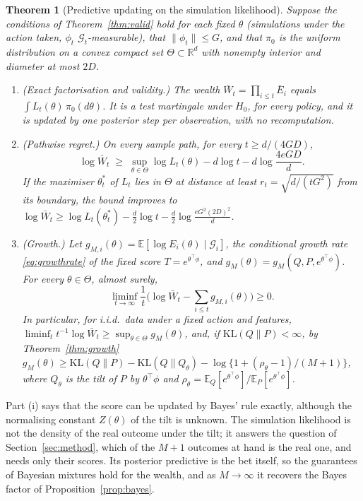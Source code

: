 \documentclass[12pt]{article}
\newcommand{\E}{\mathbb{E}}
\newcommand{\KL}{\mathrm{KL}}
\newcommand{\G}{\mathcal{G}}
\newtheorem{theorem}{Theorem}
\theoremstyle{remark}
\begin{document}
\begin{theorem}[Predictive updating on the simulation likelihood]\label{thm:simlik}
Suppose the conditions of Theorem~\ref{thm:valid} hold for each fixed $\theta$
(simulations under the action taken, $\phi_t$ $\G_t$-measurable), that
$\|\phi_t\| \le G$, and that $\pi_0$ is the uniform distribution on a convex
compact set $\Theta \subset \mathbb{R}^d$ with nonempty interior and diameter
at most $2D$.
\begin{enumerate}
  \item[(i)] (Exact factorisation and validity.) The wealth
        $\bar W_t = \prod_{i \le t} \bar E_i$ equals
        $\int L_t(\theta)\,\pi_0(d\theta)$. It is a test martingale under
        $H_0$, for every policy, and it is updated by one posterior step per
        observation, with no recomputation.
  \item[(ii)] (Pathwise regret.) On every sample path, for every
        $t \ge d/(4GD)$,
        \[
        \log \bar W_t \;\ge\; \sup_{\theta \in \Theta} \log L_t(\theta)
        - d \log t - d \log\frac{4eGD}{d}.
        \]
        If the maximiser $\theta^*_t$ of $L_t$ lies in $\Theta$ at distance at
        least $r_t = \sqrt{d/(tG^2)}$ from its boundary, the bound improves to
        $\log \bar W_t \ge \log L_t(\theta_t^*) - \frac d2 \log t
        - \frac d2 \log\frac{e G^2 (2D)^2}{d}$.
  \item[(iii)] (Growth.) Let $g_{M,i}(\theta) = \E[\log E_i(\theta) \mid \G_i]$,
        the conditional growth rate \eqref{eq:growthrate} of the fixed score
        $T = e^{\theta^\top\phi}$, and $g_M(\theta) = g_M(Q, P, e^{\theta^\top\phi})$.
        For every $\theta \in \Theta$, almost surely,
        \[
        \liminf_{t \to \infty} \frac1t \Big(\log \bar W_t - \sum_{i \le t} g_{M,i}(\theta)\Big) \ge 0 .
        \]
        In particular, for i.i.d.\ data under a fixed action and features,
        $\liminf_t t^{-1}\log \bar W_t \ge \sup_{\theta\in\Theta} g_M(\theta)$,
        and, if $\KL(Q\|P) < \infty$, by Theorem~\ref{thm:growth}
        $g_M(\theta) \ge \KL(Q\|P) - \KL(Q\|Q_\theta) - \log\{1 + (\rho_\theta - 1)/(M+1)\}$,
        where $Q_\theta$ is the tilt of $P$ by $\theta^\top\phi$ and
        $\rho_\theta = \E_Q[e^{\theta^\top\phi}]/\E_P[e^{\theta^\top\phi}]$.
\end{enumerate}
\end{theorem}

Part (i) says that the score can be updated by Bayes' rule exactly, although
the normalising constant $Z(\theta)$ of the tilt is unknown. The simulation
likelihood is not the density of the real outcome under the tilt; it answers
the question of Section~\ref{sec:method}, which of the $M+1$ outcomes at hand
is the real one, and needs only their scores. Its posterior predictive is the
bet itself, so the guarantees of Bayesian mixtures hold for the wealth, and as
$M \to \infty$ it recovers the Bayes factor of Proposition~\ref{prop:bayes}.
\end{document}
